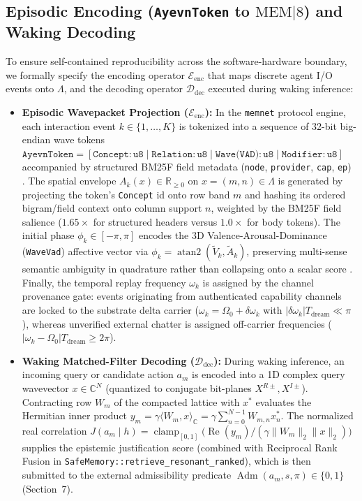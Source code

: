\documentclass[10pt, twocolumn, a4paper]{article}
\begin{document}
\subsection{Episodic Encoding (\texorpdfstring{\texttt{AyevnToken} to $\text{MEM}|8$}{AyevnToken to MEM|8}) and Waking Decoding}
To ensure self-contained reproducibility across the software-hardware boundary, we formally specify the encoding operator $\mathcal{E}_{\text{enc}}$ that maps discrete agent I/O events onto $\Lambda$, and the decoding operator $\mathcal{D}_{\text{dec}}$ executed during waking inference:
\begin{itemize}
    \item \textbf{Episodic Wavepacket Projection ($\mathcal{E}_{\text{enc}}$):} In the \texttt{memnet} protocol engine, each interaction event $k \in \{1, \dots, K\}$ is tokenized into a sequence of 32-bit big-endian wave tokens $\texttt{AyevnToken} = [\texttt{Concept}: \texttt{u8} \mid \texttt{Relation}: \texttt{u8} \mid \texttt{Wave(VAD)}: \texttt{u8} \mid \texttt{Modifier}: \texttt{u8}]$ accompanied by structured BM25F field metadata (\texttt{node}, \texttt{provider}, \texttt{cap}, \texttt{ep}) \cite{guimond2026memnet}. The spatial envelope $A_k(x) \in \mathbb{R}_{\ge 0}$ on $x = (m, n) \in \Lambda$ is generated by projecting the token's \texttt{Concept} id onto row band $m$ and hashing its ordered bigram/field context onto column support $n$, weighted by the BM25F field salience ($1.65\times$ for structured headers versus $1.0\times$ for body tokens). The initial phase $\phi_k \in [-\pi, \pi]$ encodes the 3D Valence-Arousal-Dominance (\texttt{WaveVad}) affective vector via $\phi_k = \operatorname{atan2}(\tilde{V}_k, \tilde{A}_k)$, preserving multi-sense semantic ambiguity in quadrature rather than collapsing onto a scalar score \cite{cekinmez2026ambiguity}. Finally, the temporal replay frequency $\omega_k$ is assigned by the channel provenance gate: events originating from authenticated capability channels are locked to the substrate delta carrier ($\omega_k = \Omega_0 + \delta\omega_k$ with $|\delta\omega_k| T_{\text{dream}} \ll \pi$), whereas unverified external chatter is assigned off-carrier frequencies ($|\omega_k - \Omega_0| T_{\text{dream}} \ge 2\pi$).
    \item \textbf{Waking Matched-Filter Decoding ($\mathcal{D}_{\text{dec}}$):} During waking inference, an incoming query or candidate action $a_m$ is encoded into a 1D complex query wavevector $x \in \mathbb{C}^N$ (quantized to conjugate bit-planes $X^{R\pm}, X^{I\pm}$). Contracting row $W_m$ of the compacted lattice with $x^*$ evaluates the Hermitian inner product $y_m = \gamma \langle W_m, x \rangle_{\mathbb{C}} = \gamma \sum_{n=0}^{N-1} W_{m,n} x_n^*$. The normalized real correlation $J(a_m \mid h) = \operatorname{clamp}_{[0,1]}\!\big(\operatorname{Re}(y_m) / (\gamma \|W_m\|_2 \|x\|_2)\big)$ supplies the epistemic justification score (combined with Reciprocal Rank Fusion in \texttt{SafeMemory::retrieve\_resonant\_ranked}), which is then submitted to the external admissibility predicate $\operatorname{Adm}(a_m, s, \pi) \in \{0, 1\}$ (Section~7).
\end{itemize}
\end{document}
